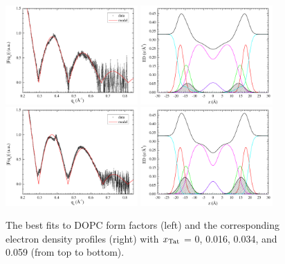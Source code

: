 \begin{figure}[htbp]
  \includegraphics[width=0.45\textwidth,valign=t]{figures/Tat/SDP_Results/XFF/DOPC_Tat_28to1_3p0_XFF1}
  \includegraphics[width=0.45\textwidth,valign=t]{figures/Tat/SDP_Results/EDP/DOPC_Tat_28to1_3p0_EDP1}
  \includegraphics[width=0.45\textwidth,valign=t]{figures/Tat/SDP_Results/XFF/DOPC_Tat_16to1_3p0_XFF1}
  \includegraphics[width=0.45\textwidth,valign=t]{figures/Tat/SDP_Results/EDP/DOPC_Tat_16to1_3p0_EDP1}
  \caption{The best fits to DOPC form factors (left) and the corresponding 
  electron density profiles (right) with $x_\textrm{Tat}$ = 0, 0.016, 0.034, 
  and 0.059 (from top to bottom).}
  \label{fig:DOPC_Tat_XFF1}
\end{figure}
